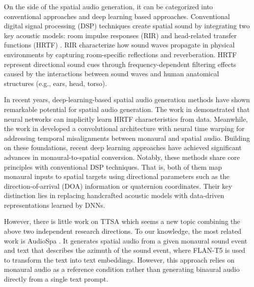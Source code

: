 \documentclass{IEEEtran}
\begin{document}

On the side of the spatial audio generation, it can be categorized into conventional approaches and deep learning based approaches. Conventional digital signal processing (DSP) techniques create spatial sound by integrating two key acoustic models: room impulse responses (RIR) \cite{brinkmann2019cross} and head-related transfer functions (HRTF) \cite{zotkin2004rendering, jianjun2015natural, brinkmann2019hutubs}.  RIR characterize how sound waves propagate in physical environments by capturing room-specific reflections and reverberation. HRTF represent directional sound cues through frequency-dependent filtering effects caused by the interactions between sound waves and human anatomical structures (e.g., ears, head, torso).

In recent years, deep-learning-based spatial audio generation methods have shown remarkable potential for spatial audio generation. {The work in \cite{gebru2021implicit} demonstrated that neural networks can implicitly learn HRTF characteristics from data. Meanwhile, the work in \cite{richard2021neural} developed a convolutional architecture with neural time warping for addressing temporal misalignments between monaural and spatial audio.} Building on these foundations, recent deep learning approaches \cite{richard2021neural, leng2022binauralgrad} have achieved significant advances in monaural-to-spatial conversion. Notably, these methods share core principles with conventional DSP techniques. That is, both of them map monaural inputs to spatial targets using directional parameters such as the direction-of-arrival (DOA) information or quaternion coordinates. Their key distinction lies in replacing handcrafted acoustic models with data-driven representations learned by DNNs.


 However, there is little work on TTSA which seems a new topic combining the above two independent research directions. To our knowledge, the most related work is AudioSpa \cite{feng2025audiospa}. It generates spatial audio from a given monaural sound event and text that describes the azimuth of the sound event, where FLAN-T5 is used to transform the text into text embeddings. However, this approach relies on monaural audio as a reference condition rather than generating binaural audio directly from a single text prompt.
\end{document}
